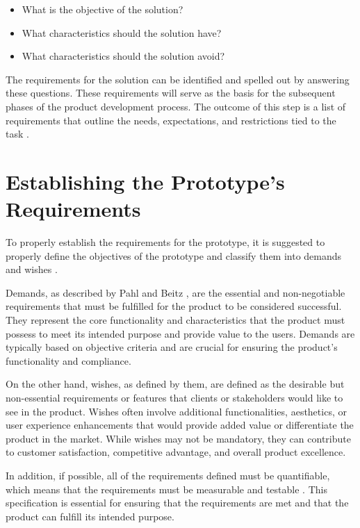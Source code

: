 \begin{itemize}
    \item What is the objective of the solution?
    \item What characteristics should the solution have?
    \item What characteristics should the solution avoid?
\end{itemize}

The requirements for the solution can be identified and spelled out by answering these questions. These requirements will serve as the basis for the subsequent phases of the product development process. The outcome of this step is a list of requirements that outline the needs, expectations, and restrictions tied to the task \cite{Pahl07a}.

\section{Establishing the Prototype's Requirements}
To properly establish the requirements for the prototype, it is suggested to properly define the objectives of the prototype and classify them into demands and wishes \cite{Pahl07n}.

Demands, as described by Pahl and Beitz \cite{Pahl07n}, are the essential and non-negotiable requirements that must be fulfilled for the product to be considered successful. They represent the core functionality and characteristics that the product must possess to meet its intended purpose and provide value to the users. Demands are typically based on objective criteria and are crucial for ensuring the product's functionality and compliance.

On the other hand, wishes, as defined by them, are defined as the desirable but non-essential requirements or features that clients or stakeholders would like to see in the product. Wishes often involve additional functionalities, aesthetics, or user experience enhancements that would provide added value or differentiate the product in the market. While wishes may not be mandatory, they can contribute to customer satisfaction, competitive advantage, and overall product excellence.

In addition, if possible, all of the requirements defined must be quantifiable, which means that the requirements must be measurable and testable \cite{Pahl07n}. This specification is essential for ensuring that the requirements are met and that the product can fulfill its intended purpose.



